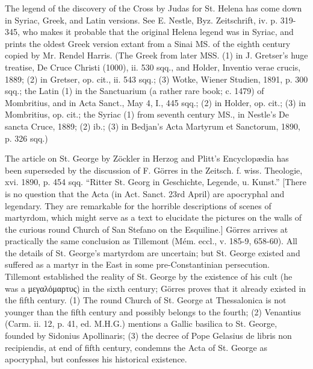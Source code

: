 
The legend of the discovery of the Cross by Judas for St. Helena has come down in Syriac, Greek, and Latin versions. See E. Nestle, Byz. Zeitschrift, iv. p. 319-345, who makes it probable that the original Helena legend was in Syriac, and prints the oldest Greek version extant from a Sinai MS. of the eighth century copied by Mr. Rendel Harris. (The Greek from later MSS. (1) in J. Gretser\texthebrew{}’s huge treatise, De Cruce Christi (1000), ii. 530 sqq., and Holder, Inventio verae crucis, 1889; (2) in Gretser, op. cit., ii. 543 sqq.; (3) Wotke, Wiener Studien, 1891, p. 300 sqq.; the Latin (1) in the Sanctuarium (a rather rare book; c. 1479) of Mombritius, and in Acta Sanct., May 4, I., 445 sqq.; (2) in Holder, op. cit.; (3) in Mombritius, op. cit.; the Syriac (1) from seventh century MS., in Nestle\texthebrew{}’s De sancta Cruce, 1889; (2) ib.; (3) in Bedjan\texthebrew{}’s Acta Martyrum et Sanctorum, 1890, p. 326 sqq.)


The article on St. George by Zöckler in Herzog and Plitt\texthebrew{}’s Encyclopædia has been superseded by the discussion of F. Görres in the Zeitsch. f. wiss. Theologie, xvi. 1890, p. 454 sqq. \texthebrew{“}Ritter St. Georg in Geschichte, Legende, u. Kunst.\texthebrew{}” [There is no question that the Acta (in Act. Sanct. 23rd April) are apocryphal and legendary. They are remarkable for the horrible descriptions of scenes of martyrdom, which might serve as a text to elucidate the pictures on the walls of the curious round Church of San Stefano on the Esquiline.] Görres arrives at practically the same conclusion as Tillemont (Mém. eccl., v. 185-9, 658-60). All the details of St. George\texthebrew{}’s martyrdom are uncertain; but St. George existed and suffered as a martyr in the East in some pre-Constantinian persecution. Tillemont established the reality of St. George by the existence of his cult (he was a \textgreek{μεγαλόμαρτυς}) in the sixth century; Görres proves that it already existed in the fifth century. (1) The round Church of St. George at Thessalonica is not younger than the fifth century and possibly belongs to the fourth; (2) Venantius (Carm. ii. 12, p. 41, ed. M.H.G.) mentions a Gallic basilica to St. George, founded by Sidonius Apollinaris; (3) the decree of Pope Gelasius de libris non recipiendis, at end of fifth century, condemns the Acta of St. George as apocryphal, but confesses his historical existence.

